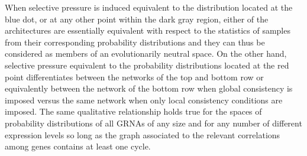 When selective pressure is induced equivalent to the distribution located at the blue dot, or at any other point within the dark gray region, either of the architectures are essentially equivalent with respect to the statistics of samples from their corresponding probability distributions and they can thus be considered as members of an evolutionarily neutral space. On the other hand, selective pressure equivalent to the probability distributions located at the red point differentiates between the networks of the top and bottom row or equivalently between the network of the bottom row when global consistency is imposed versus the same network when only local consistency conditions are imposed. The same qualitative relationship holds true for the spaces of probability distributions of all GRNAs of any size and for any number of different expression levels so long as the graph associated to the relevant correlations among genes contains at least one cycle.
